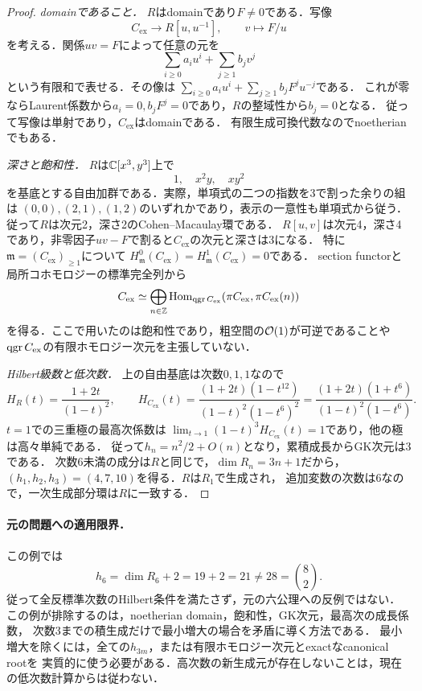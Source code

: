 \documentclass[11pt,a4paper]{ltjsarticle}
\begin{document}
\begin{proof}
\emph{domainであること．}
$R$はdomainであり$F\ne0$である．写像
\[
 C_{\mathrm{ex}}\longrightarrow R[u,u^{-1}],\qquad v\longmapsto F/u
\]
を考える．関係$uv=F$によって任意の元を
\[
 \sum_{i\geq0}a_i u^i+\sum_{j\geq1}b_jv^j
\]
という有限和で表せる．その像は
$\sum_{i\geq0}a_i u^i+\sum_{j\geq1}b_jF^j u^{-j}$である．
これが零ならLaurent係数から$a_i=0,b_jF^j=0$であり，$R$の整域性から$b_j=0$となる．
従って写像は単射であり，$C_{\mathrm{ex}}$はdomainである．
有限生成可換代数なのでnoetherianでもある．

\emph{深さと飽和性．}
$R$は$\mathbb C[x^3,y^3]$上で
\[
 1,\quad x^2y,\quad xy^2
\]
を基底とする自由加群である．実際，単項式の二つの指数を3で割った余りの組は
$(0,0),(2,1),(1,2)$のいずれかであり，表示の一意性も単項式から従う．
従って$R$は次元2，深さ2のCohen--Macaulay環である．
$R[u,v]$は次元4，深さ4であり，非零因子$uv-F$で割ると$C_{\mathrm{ex}}$の次元と深さは3になる．
特に$\mathfrak m=(C_{\mathrm{ex}})_{\geq1}$について
$H^0_{\mathfrak m}(C_{\mathrm{ex}})=H^1_{\mathfrak m}(C_{\mathrm{ex}})=0$である．
section functorと局所コホモロジーの標準完全列から
\[
 C_{\mathrm{ex}}\simeq
 \bigoplus_{n\in\mathbb Z}
 \operatorname{Hom}_{\operatorname{qgr} C_{\mathrm{ex}}}(\pi C_{\mathrm{ex}},\pi C_{\mathrm{ex}}(n))
\]
を得る．ここで用いたのは飽和性であり，粗空間の$\mathcal O(1)$が可逆であることや
$\operatorname{qgr} C_{\mathrm{ex}}$の有限ホモロジー次元を主張していない．

\emph{Hilbert級数と低次数．}
上の自由基底は次数$0,1,1$なので
\[
 H_R(t)=\frac{1+2t}{(1-t)^2},\qquad
 H_{C_{\mathrm{ex}}}(t)
 =\frac{(1+2t)(1-t^{12})}{(1-t)^2(1-t^6)^2}
 =\frac{(1+2t)(1+t^6)}{(1-t)^2(1-t^6)}.
\]
$t=1$での三重極の最高次係数は
$\lim_{t\to1}(1-t)^3H_{C_{\mathrm{ex}}}(t)=1$であり，他の極は高々単純である．
従って$h_n=n^2/2+O(n)$となり，累積成長からGK次元は3である．
次数6未満の成分は$R$と同じで，$\dim R_n=3n+1$だから，
$(h_1,h_2,h_3)=(4,7,10)$を得る．$R$は$R_1$で生成され，
追加変数の次数は6なので，一次生成部分環は$R$に一致する．
\end{proof}

\paragraph{元の問題への適用限界．}
この例では
\[
 h_6=\dim R_6+2=19+2=21\ne28=\binom{8}{2}.
\]
従って全反標準次数のHilbert条件を満たさず，元の六公理への反例ではない．
この例が排除するのは，noetherian domain，飽和性，GK次元，最高次の成長係数，
次数3までの積生成だけで最小増大の場合を矛盾に導く方法である．
最小増大を除くには，全ての$h_{3m}$，または有限ホモロジー次元とexactなcanonical rootを
実質的に使う必要がある．高次数の新生成元が存在しないことは，現在の低次数計算からは従わない．
\end{document}
